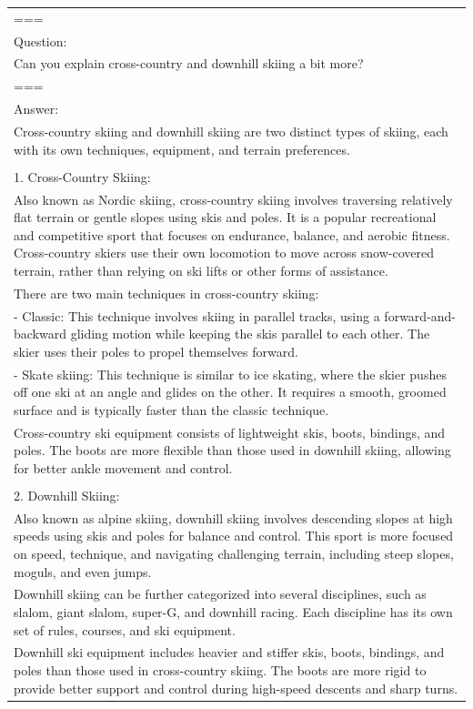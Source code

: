 \begin{table}[h!]
\begin{minipage}{0.99\columnwidth}
\begin{tcolorbox}
\begin{tabular}{p{}}
=== \\
Question: \\
Can you explain cross-country and downhill skiing a bit more? \\
=== \\
Answer: \\
Cross-country skiing and downhill skiing are two distinct types of skiing, each with its own techniques, equipment, and terrain preferences. \\
\\
1. Cross-Country Skiing: \\
Also known as Nordic skiing, cross-country skiing involves traversing relatively flat terrain or gentle slopes using skis and poles. It is a popular recreational and competitive sport that focuses on endurance, balance, and aerobic fitness. Cross-country skiers use their own locomotion to move across snow-covered terrain, rather than relying on ski lifts or other forms of assistance.  \\
There are two main techniques in cross-country skiing: \\
- Classic: This technique involves skiing in parallel tracks, using a forward-and-backward gliding motion while keeping the skis parallel to each other. The skier uses their poles to propel themselves forward.\\
- Skate skiing: This technique is similar to ice skating, where the skier pushes off one ski at an angle and glides on the other. It requires a smooth, groomed surface and is typically faster than the classic technique.  \\
Cross-country ski equipment consists of lightweight skis, boots, bindings, and poles. The boots are more flexible than those used in downhill skiing, allowing for better ankle movement and control.  \\
\\
2. Downhill Skiing:\\
Also known as alpine skiing, downhill skiing involves descending slopes at high speeds using skis and poles for balance and control. This sport is more focused on speed, technique, and navigating challenging terrain, including steep slopes, moguls, and even jumps. \\
Downhill skiing can be further categorized into several disciplines, such as slalom, giant slalom, super-G, and downhill racing. Each discipline has its own set of rules, courses, and ski equipment. \\
Downhill ski equipment includes heavier and stiffer skis, boots, bindings, and poles than those used in cross-country skiing. The boots are more rigid to provide better support and control during high-speed descents and sharp turns. \\

\end{tabular}
\end{tcolorbox}
\end{minipage}
\end{table}
